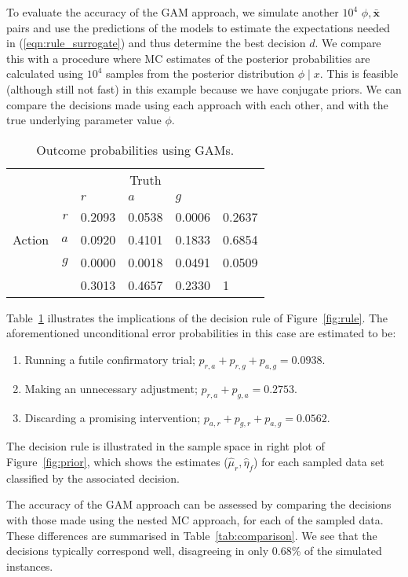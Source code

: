 \documentclass{article} %
\begin{document}
To evaluate the accuracy of the GAM approach, we simulate another $10^{4}$ $\phi, \bar{\mathbf{x}}$ pairs and use the predictions of the models to estimate the expectations needed in (\ref{eqn:rule_surrogate}) and thus determine the best decision $d$. We compare this with a procedure where MC estimates of the posterior probabilities are calculated using $10^{4}$ samples from the posterior distribution $\phi \mid x$. This is feasible (although still not fast) in this example because we have conjugate priors. We can compare the decisions made using each approach with each other, and with the true underlying parameter value $\phi$.

\begin{table}
\centering
\begin{tabular}{r r l l l l}
\toprule
& & \multicolumn{3}{c}{Truth} & \\
& & $r$ & $a$ & $g$ & \\
\midrule
\multirow{3}{*}{Action} & $r$ & 0.2093 & 0.0538 & 0.0006 & 0.2637 \\
 & $a$ & 0.0920 & 0.4101 & 0.1833 & 0.6854 \\
 & $g$ & 0.0000 & 0.0018 & 0.0491 & 0.0509 \\
 \midrule
 & & 0.3013 & 0.4657 & 0.2330 & 1 \\
\bottomrule
\end{tabular}
\caption{Outcome probabilities using GAMs.}
\label{tab:GAM}
\end{table}

Table~\ref{tab:GAM} illustrates the implications of the decision rule of Figure~\ref{fig:rule}. The aforementioned unconditional error probabilities in this case are estimated to be:
\begin{enumerate}
\item Running a futile confirmatory trial; $p_{r,a} + p_{r, g} + p_{a, g} = 0.0938$.
\item Making an unnecessary adjustment; $p_{r, a} + p_{g, a} = 0.2753$.
\item Discarding a promising intervention; $p_{a, r} + p_{g, r} + p_{a, g} = 0.0562$.
\end{enumerate}
The decision rule is illustrated in the sample space in right plot of Figure~\ref{fig:prior}, which shows the estimates ($\hat{\mu}_{r}, \hat{\eta}_{f}$) for each sampled data set classified by the associated decision.

The accuracy of the GAM approach can be assessed by comparing the decisions with those made using the nested MC approach, for each of the sampled data. These differences are summarised in Table~\ref{tab:comparison}. We see that the decisions typically correspond well, disagreeing in only 0.68\% of the simulated instances.
\end{document}
